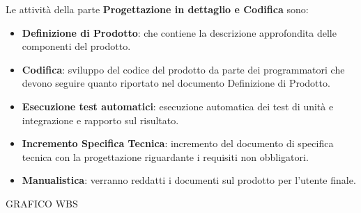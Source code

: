 {{	 Le attivit\`{a} della parte \textbf{Progettazione in dettaglio e Codifica} sono:
	 \begin{itemize}
		 \item \textbf{Definizione di Prodotto}: che contiene la descrizione approfondita delle componenti del prodotto.
		 \item \textbf{Codifica}: sviluppo del codice del prodotto da parte dei programmatori che devono seguire quanto riportato nel documento Definizione di Prodotto.
		 \item \textbf{Esecuzione test automatici}: esecuzione automatica dei test di unit\`{a} e integrazione e rapporto sul risultato.
		 \item \textbf{Incremento Specifica Tecnica}: incremento del documento di specifica tecnica con la progettazione riguardante i requisiti non obbligatori.
		 \item \textbf{Manualistica}: verranno reddatti i documenti sul prodotto per l'utente finale.
	 \end{itemize}
	
	
	GRAFICO WBS
	
}}
